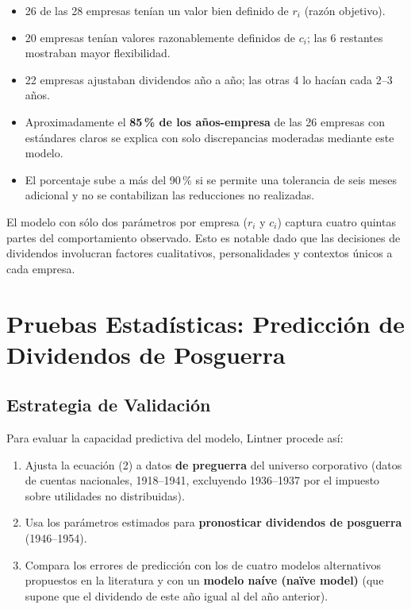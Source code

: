 \documentclass[12pt]{article}
\begin{document}
\begin{itemize}
  \item 26 de las 28 empresas ten\'ian un valor bien definido de $r_i$ (raz\'on objetivo).
  \item 20 empresas ten\'ian valores razonablemente definidos de $c_i$; las 6 restantes
        mostraban mayor flexibilidad.
  \item 22 empresas ajustaban dividendos a\~no a a\~no; las otras 4 lo hac\'ian cada 2--3 a\~nos.
  \item Aproximadamente el \textbf{85\,\% de los a\~nos-empresa} de las 26 empresas con
        est\'andares claros se explica con solo discrepancias moderadas mediante este modelo.
  \item El porcentaje sube a m\'as del 90\,\% si se permite una tolerancia de seis meses
        adicional y no se contabilizan las reducciones no realizadas.
\end{itemize}

\begin{intuicion}
El modelo con s\'olo dos par\'ametros por empresa ($r_i$ y $c_i$) captura cuatro quintas
partes del comportamiento observado. Esto es notable dado que las decisiones de dividendos
involucran factores cualitativos, personalidades y contextos \'unicos a cada empresa.
\end{intuicion}

\section{Pruebas Estad\'isticas: Predicci\'on de Dividendos de Posguerra}

\subsection{Estrategia de Validaci\'on}

Para evaluar la capacidad predictiva del modelo, Lintner procede as\'i:

\begin{enumerate}
  \item Ajusta la ecuaci\'on (2) a datos \textbf{de preguerra} del universo corporativo
        (datos de cuentas nacionales, 1918--1941, excluyendo 1936--1937 por el impuesto
        sobre utilidades no distribuidas).
  \item Usa los par\'ametros estimados para \textbf{pronosticar dividendos de posguerra}
        (1946--1954).
  \item Compara los errores de predicci\'on con los de cuatro modelos alternativos propuestos
        en la literatura y con un \textbf{modelo na\'ive (na\"ive model)} (que supone que el
        dividendo de este a\~no igual al del a\~no anterior).
\end{enumerate}
\end{document}
